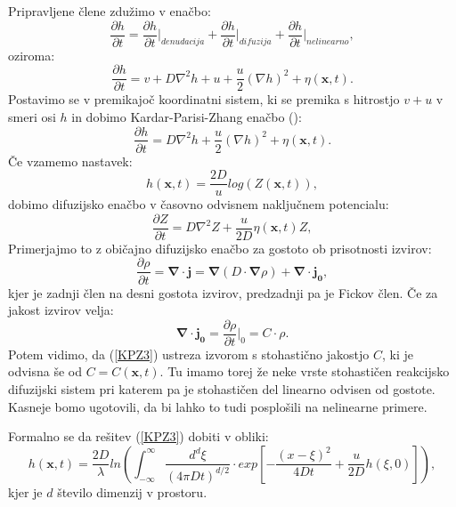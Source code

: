 \documentclass[a4paper, twoside, 12pt]{book}
\begin{document}
Pripravljene člene zdužimo v enačbo:
\begin{equation}
  \frac{\partial h}{\partial t} = \frac{\partial h}{\partial t} \bigg|_{denudacija} + \frac{\partial h}{\partial t} \bigg|_{difuzija} + \frac{\partial h}{\partial t} \bigg|_{nelinearno},
  \label{KPZ1}
\end{equation}
oziroma:
\begin{equation}
  \frac{\partial h}{\partial t} = v + D \nabla^2 h + u + \frac{u}{2} (\nabla h)^2 + \eta (\mathbf{x},t).
  \label{KPZ2}
\end{equation}
Postavimo se v premikajoč koordinatni sistem, ki se premika s hitrostjo $v + u$ v smeri osi $h$ in dobimo Kardar-Parisi-Zhang enačbo (\cite{kardar1986dynamic}):
\begin{equation}
  \frac{\partial h}{\partial t} = D \nabla^2 h + \frac{u}{2} (\nabla h)^2 + \eta (\mathbf{x},t).
  \label{KPZ}
\end{equation}
Če vzamemo nastavek:
\begin{equation}
  h(\mathbf{x},t) = \frac{2 D}{u} log(Z(\mathbf{x},t)),
\end{equation}
dobimo difuzijsko enačbo v časovno odvisnem naključnem potencialu:
\begin{equation}
  \frac{\partial Z}{\partial t} = D \nabla^2 Z + \frac{u}{2 D} \eta(\mathbf{x},t) Z,
  \label{KPZ3}
\end{equation}
Primerjajmo to z običajno difuzijsko enačbo za gostoto ob prisotnosti izvirov:
\begin{equation}
  \frac{ \partial \rho}{ \partial t} = \mathbf{\nabla} \cdot \mathbf{j} = \mathbf{\nabla} (D \cdot \mathbf{\nabla} \rho) + \mathbf{\nabla} \cdot \mathbf{j_0},
  \label{dinamicna-splosna-3}
\end{equation}
kjer je zadnji člen na desni gostota izvirov, predzadnji pa je Fickov člen. Če za jakost izvirov velja:
\begin{equation}
  \mathbf{\nabla} \cdot \mathbf{j_0} = \frac{\partial \rho}{\partial t}\bigg|_{0} = C \cdot \rho.
  \label{jakost-izvirov}
\end{equation}
Potem vidimo, da (\ref{KPZ3}) ustreza izvorom s stohastično jakostjo $C$, ki je odvisna še od $C=C(\mathbf{x},t)$. Tu imamo torej že neke vrste stohastičen reakcijsko difuzijski sistem pri katerem pa je stohastičen del linearno odvisen od gostote. Kasneje bomo ugotovili, da bi lahko to tudi posplošili na nelinearne primere.

Formalno se da rešitev (\ref{KPZ3}) dobiti v obliki:
\begin{equation}
  h(\mathbf{x},t) = \frac{2 D}{\lambda} ln \left( \int_{-\infty}^{\infty} \frac{d^d \xi}{(4 \pi D t)^{d/2}} \cdot exp \left[-\frac{(x-\xi)^2}{4 D t} + \frac{u}{2 D}h(\xi,0) \right] \right),
\end{equation}
kjer je $d$ število dimenzij v prostoru.
\end{document}
